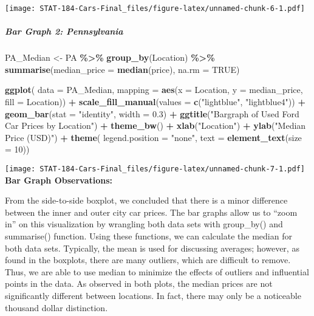 \documentclass[
]{article}
\newenvironment{Shaded}{\begin{snugshade}}{\end{snugshade}}
\newcommand{\AttributeTok}[1]{\textcolor[rgb]{0.13,0.29,0.53}{#1}}
\newcommand{\ConstantTok}[1]{\textcolor[rgb]{0.56,0.35,0.01}{#1}}
\newcommand{\DecValTok}[1]{\textcolor[rgb]{0.00,0.00,0.81}{#1}}
\newcommand{\FloatTok}[1]{\textcolor[rgb]{0.00,0.00,0.81}{#1}}
\newcommand{\FunctionTok}[1]{\textcolor[rgb]{0.13,0.29,0.53}{\textbf{#1}}}
\newcommand{\NormalTok}[1]{#1}
\newcommand{\OtherTok}[1]{\textcolor[rgb]{0.56,0.35,0.01}{#1}}
\newcommand{\SpecialCharTok}[1]{\textcolor[rgb]{0.81,0.36,0.00}{\textbf{#1}}}
\newcommand{\StringTok}[1]{\textcolor[rgb]{0.31,0.60,0.02}{#1}}
\begin{document}
\texttt{[image: STAT-184-Cars-Final\_files/figure-latex/unnamed-chunk-6-1.pdf]}

\hypertarget{bar-graph-2-pennsylvania}{%
\subparagraph{Bar Graph 2:
Pennsylvania}\label{bar-graph-2-pennsylvania}}

\begin{Shaded}
\begin{Highlighting}[]
\NormalTok{PA\_Median }\OtherTok{\textless{}{-}}\NormalTok{ PA }\SpecialCharTok{\%\textgreater{}\%}
  \FunctionTok{group\_by}\NormalTok{(Location) }\SpecialCharTok{\%\textgreater{}\%}
  \FunctionTok{summarise}\NormalTok{(}\AttributeTok{median\_price =} \FunctionTok{median}\NormalTok{(price), }\AttributeTok{na.rm =} \ConstantTok{TRUE}\NormalTok{)}

\FunctionTok{ggplot}\NormalTok{(}
\AttributeTok{data =}\NormalTok{ PA\_Median,}
\AttributeTok{mapping =} \FunctionTok{aes}\NormalTok{(}\AttributeTok{x =}\NormalTok{ Location, }\AttributeTok{y =}\NormalTok{ median\_price, }\AttributeTok{fill =}\NormalTok{ Location)) }\SpecialCharTok{+}
  \FunctionTok{scale\_fill\_manual}\NormalTok{(}\AttributeTok{values =} \FunctionTok{c}\NormalTok{(}\StringTok{"lightblue"}\NormalTok{, }\StringTok{"lightblue4"}\NormalTok{)) }\SpecialCharTok{+}
  \FunctionTok{geom\_bar}\NormalTok{(}\AttributeTok{stat =} \StringTok{"identity"}\NormalTok{, }\AttributeTok{width =} \FloatTok{0.3}\NormalTok{) }\SpecialCharTok{+}
  \FunctionTok{ggtitle}\NormalTok{(}\StringTok{"Bargraph of Used Ford Car Prices by Location"}\NormalTok{) }\SpecialCharTok{+}
  \FunctionTok{theme\_bw}\NormalTok{() }\SpecialCharTok{+}
  \FunctionTok{xlab}\NormalTok{(}\StringTok{"Location"}\NormalTok{) }\SpecialCharTok{+}
  \FunctionTok{ylab}\NormalTok{(}\StringTok{"Median Price (USD)"}\NormalTok{) }\SpecialCharTok{+}
  \FunctionTok{theme}\NormalTok{(}
  \AttributeTok{legend.position =} \StringTok{"none"}\NormalTok{,}
  \AttributeTok{text =} \FunctionTok{element\_text}\NormalTok{(}\AttributeTok{size =} \DecValTok{10}\NormalTok{))}
\end{Highlighting}
\end{Shaded}

\texttt{[image: STAT-184-Cars-Final\_files/figure-latex/unnamed-chunk-7-1.pdf]}
\textbf{Bar Graph Observations:}

From the side-to-side boxplot, we concluded that there is a minor
difference between the inner and outer city car prices. The bar graphs
allow us to ``zoom in'' on this visualization by wrangling both data
sets with group\_by() and summarise() function. Using these functions,
we can calculate the median for both data sets. Typically, the mean is
used for discussing averages; however, as found in the boxplots, there
are many outliers, which are difficult to remove. Thus, we are able to
use median to minimize the effects of outliers and influential points in
the data. As observed in both plots, the median prices are not
significantly different between locations. In fact, there may only be a
noticeable thousand dollar distinction.
\end{document}
